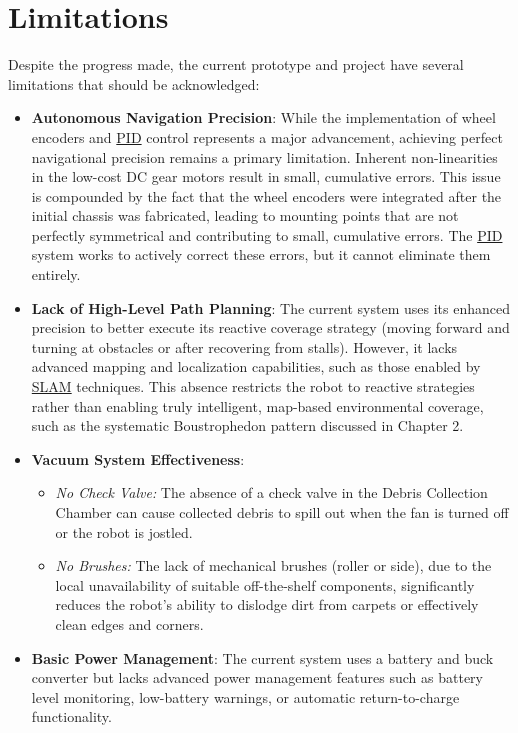 \section{Limitations}
\label{sec:limitations_conclusion_new}
Despite the progress made, the current prototype and project have several limitations that should be acknowledged:
\begin{itemize}
    \item \textbf{Autonomous Navigation Precision}: While the implementation of wheel encoders and \hyperref[term:pid]{PID} control represents a major advancement, achieving perfect navigational precision remains a primary limitation. Inherent non-linearities in the low-cost DC gear motors result in small, cumulative errors. This issue is compounded by the fact that the wheel encoders were integrated after the initial chassis was fabricated, leading to mounting points that are not perfectly symmetrical and contributing to small, cumulative errors. The \hyperref[term:pid]{PID} system works to actively correct these errors, but it cannot eliminate them entirely.
    \item \textbf{Lack of High-Level Path Planning}: The current system uses its enhanced precision to better execute its reactive coverage strategy (moving forward and turning at obstacles or after recovering from stalls). However, it lacks advanced mapping and localization capabilities, such as those enabled by \hyperref[term:slam]{SLAM} techniques. This absence restricts the robot to reactive strategies rather than enabling truly intelligent, map-based environmental coverage, such as the systematic Boustrophedon pattern discussed in Chapter 2.
    \item \textbf{Vacuum System Effectiveness}:
        \begin{itemize}
            \item \textit{No Check Valve:} The absence of a check valve in the Debris Collection Chamber can cause collected debris to spill out when the fan is turned off or the robot is jostled.
            \item \textit{No Brushes:} The lack of mechanical brushes (roller or side), due to the local unavailability of suitable off-the-shelf components, significantly reduces the robot's ability to dislodge dirt from carpets or effectively clean edges and corners.
        \end{itemize}
    \item \textbf{Basic Power Management}: The current system uses a battery and buck converter but lacks advanced power management features such as battery level monitoring, low-battery warnings, or automatic return-to-charge functionality.
\end{itemize}
